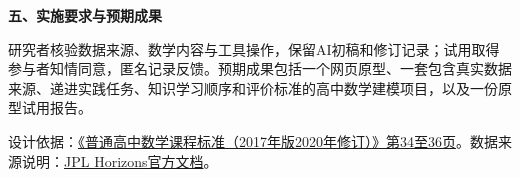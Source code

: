\documentclass[UTF8,a4paper,11pt,fontset=windows]{ctexart}
\newcommand{\lead}[1]{\par\noindent\textbf{#1}\par\nobreak}
\begin{document}
\lead{五、实施要求与预期成果}
研究者核验数据来源、数学内容与工具操作，保留AI初稿和修订记录；试用取得参与者知情同意，匿名记录反馈。预期成果包括一个网页原型、一套包含真实数据来源、递进实践任务、知识学习顺序和评价标准的高中数学建模项目，以及一份原型试用报告。

\vspace{0.2em}
{\footnotesize\noindent 设计依据：\href{https://jyj.changdu.gov.cn/cdsjyj/c101476/202205/764ee1914e3c45aaba8e372f1b628a34/files/75676dfa9af0442db1457404a884a69f.pdf}{《普通高中数学课程标准（2017年版2020年修订）》第34至36页}。数据来源说明：\href{https://ssd.jpl.nasa.gov/horizons/manual.html}{JPL Horizons官方文档}。\par}
\end{document}
